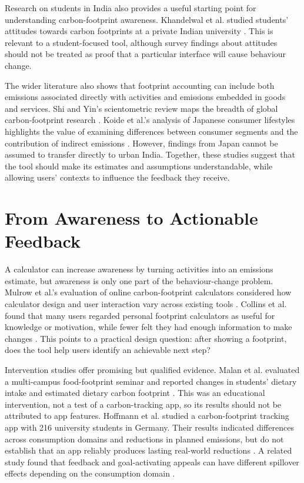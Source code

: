 \documentclass[10pt,a4paper,twocolumn]{article}
\begin{document}
Research on students in India also provides a useful starting point for understanding carbon-footprint awareness. Khandelwal et al. studied students' attitudes towards carbon footprints at a private Indian university \cite{khandelwal2019}. This is relevant to a student-focused tool, although survey findings about attitudes should not be treated as proof that a particular interface will cause behaviour change.

The wider literature also shows that footprint accounting can include both emissions associated directly with activities and emissions embedded in goods and services. Shi and Yin's scientometric review maps the breadth of global carbon-footprint research \cite{shi2021}. Koide et al.'s analysis of Japanese consumer lifestyles highlights the value of examining differences between consumer segments and the contribution of indirect emissions \cite{koide2019}. However, findings from Japan cannot be assumed to transfer directly to urban India. Together, these studies suggest that the tool should make its estimates and assumptions understandable, while allowing users' contexts to influence the feedback they receive.

\section{From Awareness to Actionable Feedback}
A calculator can increase awareness by turning activities into an emissions estimate, but awareness is only one part of the behaviour-change problem. Mulrow et al.'s evaluation of online carbon-footprint calculators considered how calculator design and user interaction vary across existing tools \cite{mulrow2019}. Collins et al. found that many users regarded personal footprint calculators as useful for knowledge or motivation, while fewer felt they had enough information to make changes \cite{collins2020}. This points to a practical design question: after showing a footprint, does the tool help users identify an achievable next step?

Intervention studies offer promising but qualified evidence. Malan et al. evaluated a multi-campus food-footprint seminar and reported changes in students' dietary intake and estimated dietary carbon footprint \cite{malan2020}. This was an educational intervention, not a test of a carbon-tracking app, so its results should not be attributed to app features. Hoffmann et al. studied a carbon-footprint tracking app with 216 university students in Germany. Their results indicated differences across consumption domains and reductions in planned emissions, but do not establish that an app reliably produces lasting real-world reductions \cite{hoffmann2024}. A related study found that feedback and goal-activating appeals can have different spillover effects depending on the consumption domain \cite{lasarov2024}.
\end{document}
